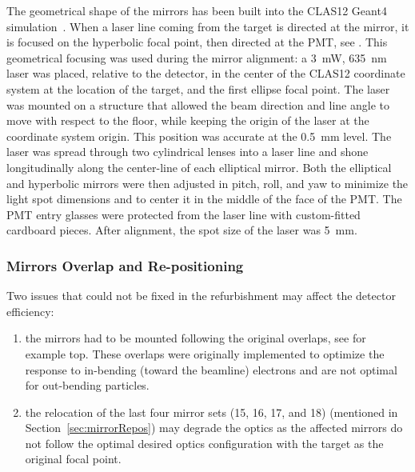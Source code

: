 The geometrical shape of the mirrors has been built into the CLAS12 Geant4 simulation~\cite{sim-nim}. When a laser line
coming from the target is directed at the mirror, it is focused on the hyperbolic focal point, then directed at the PMT,
see . This geometrical focusing was used during the mirror alignment: a 3~mW, 635~nm laser was
placed, relative to the detector, in the center of the CLAS12 coordinate system at the location of the target, and the first
ellipse focal point. The laser was mounted on a structure that allowed the beam direction and line angle to move with respect
to the floor, while keeping the origin of the laser at the coordinate system origin. This position was accurate at the 0.5~mm
level. The laser was spread through two cylindrical lenses into a laser line and shone longitudinally along the center-line of
each elliptical mirror. Both the elliptical and hyperbolic mirrors were then adjusted in pitch, roll, and yaw to minimize the
light spot dimensions and to center it in the middle of the face of the PMT. The PMT entry glasses were protected from
the laser line with custom-fitted cardboard pieces. After alignment, the spot size of the laser was 5~mm.

\subsubsection{Mirrors Overlap and Re-positioning}
\label{sec:possibleInefficiency}

Two issues that could not be fixed in the refurbishment may affect the detector efficiency:

\begin{enumerate}
  \item the mirrors had to be mounted following the original overlaps, see for example  top.
    These overlaps were originally implemented to optimize the response to in-bending (toward the beamline) electrons
    and are not optimal for out-bending particles.
  \item the relocation of the last four mirror sets (15, 16, 17, and 18) (mentioned in Section~\ref{sec:mirrorRepos})
    may degrade the optics as the affected mirrors do not follow the optimal desired optics configuration with the
    target as the original focal point.
\end{enumerate}

